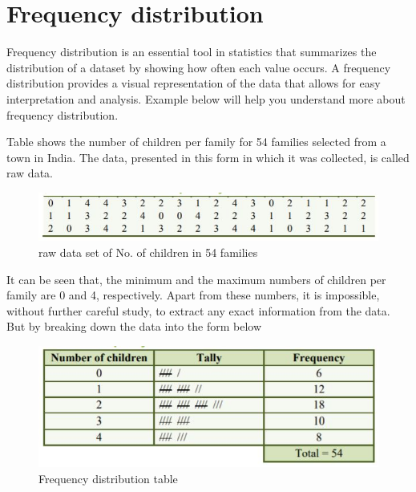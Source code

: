 \documentclass[
]{book}
\begin{document}
\hypertarget{frequency-distribution}{%
\chapter{Frequency distribution}\label{frequency-distribution}}

Frequency distribution is an essential tool in statistics that summarizes the distribution of a dataset by showing how often each value occurs. A frequency distribution provides a visual representation of the data that allows for easy interpretation and analysis. Example below will help you understand more about frequency distribution.

Table shows the number of children per family for 54 families selected
from a town in India. The data, presented in this form in which it was
collected, is called raw data.

\begin{figure}

{\centering \includegraphics[width=0.7\linewidth]{images/image3} 

}

\caption{raw data set of No. of children in 54 families}\label{fig:raw}
\end{figure}

It can be seen that, the minimum and the maximum numbers of children per
family are 0 and 4, respectively. Apart from these numbers, it is
impossible, without further careful study, to extract any exact
information from the data. But by breaking down the data into the form
below

\begin{figure}

{\centering \includegraphics[width=0.9\linewidth]{images/image4} 

}

\caption{Frequency distribution table}\label{fig:freq}
\end{figure}
\end{document}

